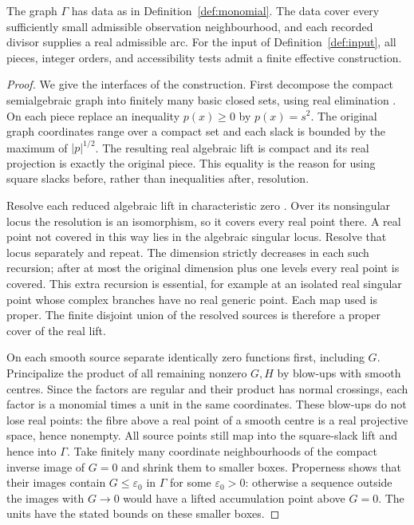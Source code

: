 \begin{proposition}\label{prop:real-cover}
The graph $\Gamma$ has data as in Definition~\ref{def:monomial}.
The data cover every sufficiently small admissible observation
neighbourhood, and each recorded divisor supplies a real admissible arc.
For the input of Definition~\ref{def:input}, all pieces, integer orders,
and accessibility tests admit a finite effective construction.
\end{proposition}
\begin{proof}
We give the interfaces of the construction. First decompose the compact
semialgebraic graph into finitely many basic closed sets, using real
elimination \cite{BCR98,BPR06}. On each piece replace an inequality
$p(x)\ge0$ by $p(x)=s^2$. The original graph coordinates range over a
compact set and each slack is bounded by the maximum of $|p|^{1/2}$.
The resulting real algebraic lift is compact and its real projection is
exactly the original piece. This equality is the reason for using square
slacks before, rather than inequalities after, resolution.

Resolve each reduced algebraic lift in characteristic zero
\cite{BM97}. Over its nonsingular locus the resolution is an isomorphism,
so it covers every real point there. A real point not covered in this way
lies in the algebraic singular locus. Resolve that locus separately and
repeat. The dimension strictly decreases in each such recursion; after
at most the original dimension plus one levels every real point is
covered. This extra recursion is essential, for example at an isolated
real singular point whose complex branches have no real generic point.
Each map used is proper. The finite disjoint union of the resolved
sources is therefore a proper cover of the real lift.

On each smooth source separate identically zero functions first, including
$G$. Principalize the product of all remaining nonzero $G,H$ by blow-ups
with smooth centres. Since the factors are regular and their product has
normal crossings, each factor is a monomial times a unit in the same
coordinates. These blow-ups do not lose real points: the fibre above a
real point of a smooth centre is a real projective space, hence nonempty.
All source points still map into the square-slack lift and hence into
$\Gamma$. Take finitely many coordinate neighbourhoods of the compact
inverse image of $G=0$ and shrink them to smaller boxes. Properness shows
that their images contain $G\le\varepsilon_0$ in $\Gamma$ for some
$\varepsilon_0>0$: otherwise a sequence outside the images with $G\to0$
would have a lifted accumulation point above $G=0$. The units have the
stated bounds on these smaller boxes.


\end{proof}
